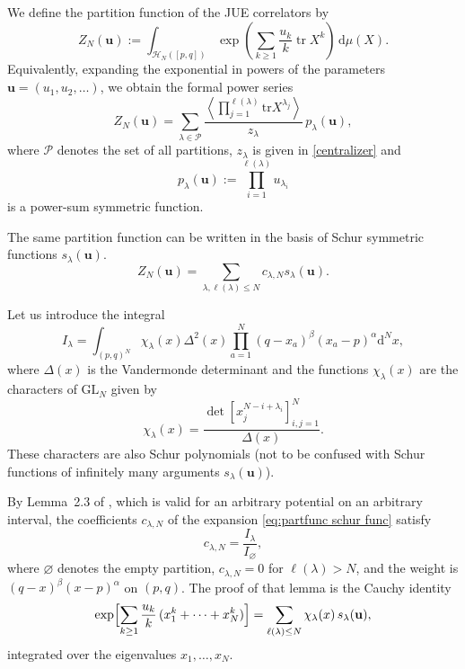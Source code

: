 \documentclass{article}
\newcommand{\tr}{\mathrm{tr}}
\newcommand{\dif}{\mathrm{d}}
\theoremstyle{plain}
\theoremstyle{definition}
\numberwithin{equation}{section}
\begin{document}
We define the partition function of the JUE correlators by
\begin{equation}
    \label{eq:partition_function}
    Z_N(\mathbf{u})
    :=
    \int_{\mathcal{H}_N([p,q])}
    \exp\left(
    \sum_{k\geq 1}\frac{u_k}{k}\operatorname{tr}X^k
    \right)
    \,\dif\mu(X).
\end{equation}
Equivalently, expanding the exponential in powers of the parameters $\mathbf{u}=(u_1,u_2,\ldots)$, we obtain the formal power series
\begin{equation}
    \label{eq:pertfunc power sums}
    Z_N(\mathbf{u})
    =
    \sum_{\lambda\in\mathcal{P}}
    \frac{
    \left\langle
    \prod_{j=1}^{\ell(\lambda)}
    \tr X^{\lambda_j}
    \right\rangle
    }{z_\lambda}
    \,p_\lambda(\mathbf{u}),
\end{equation}
where $\mathcal{P}$ denotes the set of all partitions, $z_\lambda$ is given in \eqref{centralizer} and
\begin{equation}
p_\lambda(\mathbf{u})
:=
\prod_{i=1}^{\ell(\lambda)}u_{\lambda_i}
\end{equation}
is a power-sum symmetric function. 

The same partition function can be written in the basis of Schur symmetric functions $s_\lambda(\mathbf{u})$.
\begin{equation}
    \label{eq:partfunc schur func}
    Z_N(\mathbf{u}) = \sum_{\lambda, \ell(\lambda) \le N} c_{\lambda, N}  s_{\lambda}(\mathbf{u}).
\end{equation}

Let us introduce the integral
\begin{equation}
\label{eq:Schur-Selberg-like-integral}
    I_{\lambda} = \int_{(p,q)^{N}} \chi_{\lambda}(x) \Delta^{2}(x)\prod_{a=1}^{N}(q-x_{a})^{\beta} (x_{a}-p)^{\alpha} \dif^{N}x,
\end{equation}
where $\Delta(x)$ is the Vandermonde determinant and the functions $\chi_\lambda(x)$ are the characters of $\mathrm{GL}_N$ given by 
\begin{equation}
    \chi_\lambda (x) = \frac{\det \left[x_j^{N-i+\lambda_i}\right]_{i,j=1}^{N}}{\Delta(x)}.
\end{equation}
These characters are also Schur polynomials (not to be confused with Schur functions of infinitely many arguments $s_\lambda(\mathbf{u})$).

By Lemma~2.3 of \cite{gisonni2021jacobi}, which is valid for an arbitrary potential on an arbitrary interval, the coefficients $c_{\lambda,N}$ of the expansion \eqref{eq:partfunc schur func} satisfy
\begin{equation}
    \label{eq:clambda by Ilambda}
    c_{\lambda,N} = \frac{I_\lambda}{I_\varnothing},
\end{equation}
where $\varnothing$ denotes the empty partition, $c_{\lambda,N}=0$ for $\ell(\lambda)>N$, and the weight is $(q-x)^\beta(x-p)^\alpha$ on $(p,q)$. The proof of that lemma is the Cauchy identity
\[
\exp\Bigl[\sum_{k\ge1}\frac{u_k}{k}\,(x_1^k+\dots+x_N^k)\Bigr]=\sum_{\ell(\lambda)\le N}\chi_\lambda(x)\,s_\lambda(\mathbf u),
\]
integrated over the eigenvalues $x_1,\dots,x_N$.
\end{document}
